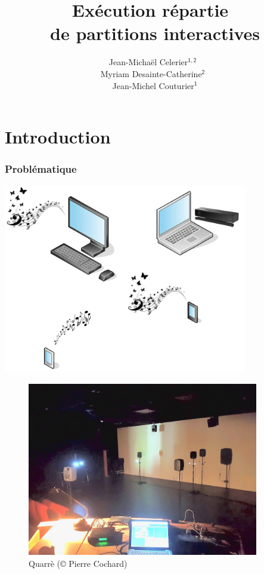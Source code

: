 \documentclass[handout]{beamer}
\title{Exécution répartie~\\de partitions interactives}
\subtitle{}
\date{}
\author{Jean-Michaël Celerier$\mathsf{^{1,2}}$~\\ Myriam Desainte-Catherine$\mathsf{^{2}}$~\\ Jean-Michel Couturier$\mathsf{^{1}}$}
\institute{1. Blue Yeti --- 2. SCRIME / LaBRI}
\begin{document}
\maketitle
\begin{frame}
    \tableofcontents
\end{frame}

\section{Introduction}
\begin{frame}
    \frametitle{Problématique}
    \Large
    
    \centering
    \includegraphics[width=0.8\textwidth]{draw/groupes-ex.png}
\end{frame}

\begin{frame}
    \Large
    \begin{figure}
    	\centering
    	\includegraphics[width=0.9\textwidth]{images/quarre.jpg}
    	\caption{Quarrè (© Pierre Cochard)}
    \end{figure}
\end{frame}
\end{document}
